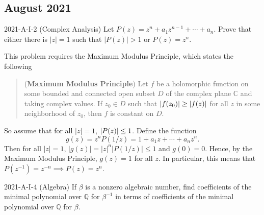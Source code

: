\documentclass{article}
\begin{document}
\subsection{August 2021}
\begin{prb}{2021-A-I-2 (Complex Analysis)}
	Let $P(z) = z^{n} + a_{1}z^{n-1} + \dotsm + a_{n}$. Prove that either there is $|z| = 1$ such that $|P(z)| > 1$ or $P(z) = z^{n}$. 
\end{prb}
\begin{solutions}
	This problem requires the Maximum Modulus Principle, which states the following 
		\begin{quote}
			(\textbf{Maximum Modulus Principle}) Let $f$ be a holomorphic function on some bounded and connected open subset $D$ of the complex plane $\mathbb{C}$ and taking complex values. If $z_{0} \in D$ such that $\left| f(z_{0}) \right| \geq \left| f(z) \right|$ for all $z$ in some neighborhood of $z_{0}$, then $f$ is constant on $D$. 
		\end{quote} 
	So assume that for all $|z| = 1$, $\left| P(z) \right| \leq 1$. Define the function 
		\begin{equation}
			g(z) = z^{n}P(1/z) = 1 + a_{1}z + \dotsm + a_{n}z^{n}. 
		\end{equation}
	Then for all $|z| = 1$, $|g(z)| = |z|^{n}|P(1/z)| \leq 1$ and $g(0) = 0$. Hence, by the Maximum Modulus Principle, $g(z) = 1$ for all $z$. In particular, this means that $P(z^{-1}) = z^{-n} \implies P(z) = z^{n}$. 
\end{solutions}
\begin{prb}{2021-A-I-4 (Algebra)}
	If $\beta$ is a nonzero algebraic number, find coefficients of the minimal polynomial over $\mathbb{Q}$ for $\beta^{-1}$ in terms of coefficients of the minimal polynomial over $\mathbb{Q}$ for $\beta$. 
\end{prb}
\end{document}
